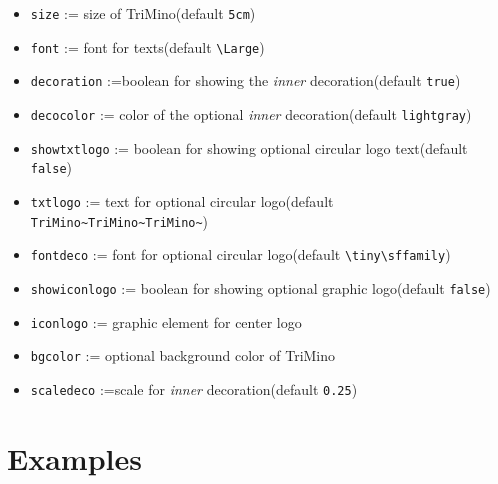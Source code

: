 \documentclass[11pt,a4paper]{ltxdoc}
\begin{document}
\begin{itemize}
	\item \lstinline[language={[latex]TeX},basicstyle=\ttfamily]|size| := size of \textsf{TriMino}\hfill(default \lstinline[language={[latex]TeX},basicstyle=\ttfamily]|5cm|)
	\item \lstinline[language={[latex]TeX},basicstyle=\ttfamily]|font| := font for texts\hfill(default \lstinline[language={[latex]TeX},basicstyle=\ttfamily]|\Large|)
	\item \lstinline[language={[latex]TeX},basicstyle=\ttfamily]|decoration| :=boolean for showing the \textit{inner} decoration\hfill(default \lstinline[language={[latex]TeX},basicstyle=\ttfamily]|true|)
	\item \lstinline[language={[latex]TeX},basicstyle=\ttfamily]|decocolor| := color of the optional \textit{inner} decoration\hfill(default \lstinline[language={[latex]TeX},basicstyle=\ttfamily]|lightgray|)
	\item \lstinline[language={[latex]TeX},basicstyle=\ttfamily]|showtxtlogo| := boolean for showing optional circular logo text\hfill(default \lstinline[language={[latex]TeX},basicstyle=\ttfamily]|false|)
	\item \lstinline[language={[latex]TeX},basicstyle=\ttfamily]|txtlogo| := text for optional circular logo\hfill(default \lstinline[language={[latex]TeX},basicstyle=\ttfamily]|TriMino~TriMino~TriMino~|)
	\item \lstinline[language={[latex]TeX},basicstyle=\ttfamily]|fontdeco| := font for optional circular logo\hfill(default \lstinline[language={[latex]TeX},basicstyle=\ttfamily]|\tiny\sffamily|)
	\item \lstinline[language={[latex]TeX},basicstyle=\ttfamily]|showiconlogo| := boolean for showing optional graphic logo\hfill(default \lstinline[language={[latex]TeX},basicstyle=\ttfamily]|false|)
	\item \lstinline[language={[latex]TeX},basicstyle=\ttfamily]|iconlogo| := graphic element for center logo
	\item \lstinline[language={[latex]TeX},basicstyle=\ttfamily]|bgcolor| := optional background color of \textsf{TriMino}
	\item \lstinline[language={[latex]TeX},basicstyle=\ttfamily]|scaledeco| :=scale for \textit{inner} decoration\hfill(default \lstinline[language={[latex]TeX},basicstyle=\ttfamily]|0.25|)
\end{itemize}

\pagebreak

\section{Examples}
\end{document}

